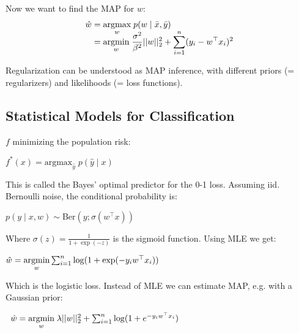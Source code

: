 Now we want to find the MAP for $w$:
\begin{align*}
	\hat w &= \underset{w}{\text{argmax}} \; p(w \; | \; \bar x, \bar y) \\[-9pt]
	&= \underset{w}{\text{argmin}} \; \frac{\sigma^2}{\beta^2} ||w||_2^2 + \sum_{i=1}^n(y_i - w^\top x_i)^2
\end{align*}

Regularization can be understood as MAP inference, with different priors (= regularizers) and likelihoods (= loss functions).

\subsection*{Statistical Models for Classification}

$f$ minimizing the population risk:

\qquad \qquad $f^*(x) = \text{argmax}_{\hat y} \; p(\hat y \; | \; x)$

This is called the Bayes' optimal predictor for the 0-1 loss. Assuming iid. Bernoulli noise, the conditional probability is:

\qquad \qquad$p(y \; | \; x,w) \sim \text{Ber}(y; \sigma(w^\top x))$

Where $\sigma(z) = \frac{1}{1 + \exp(-z)}$ is the sigmoid function. Using MLE we get:

\quad \;$\hat w = \underset{w}{\text{argmin}} \sum_{i = 1}^n \log (1 + \exp(-y_i w^\top x_i))$

Which is the logistic loss. Instead of MLE we can estimate MAP, e.g. with a Gaussian prior:

$\; \;\hat w = \underset{w}{\text{argmin}} \; \lambda ||w||_2^2 + \sum_{i = 1}^n \log (1 + e^{-y_i w^\top x_i})$







